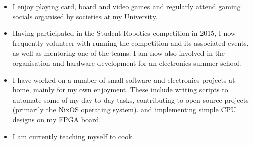 
\begin{itemize}
\item I enjoy playing card, board and video games and regularly attend gaming socials organised by societies at my University.
\item Having participated in the Student Robotics competition in 2015, I now frequently volunteer with running the competition and its associated events, as well as mentoring one of the teams. I am now also involved in the organisation and hardware development for an electronics summer school.
\item I have worked on a number of small software and electronics projects at home, mainly for my own enjoyment. These include writing scripts to automate some of my day-to-day tasks, contributing to open-source projects (primarily the NixOS operating system). and implementing simple CPU designs on my FPGA board.
\item I am currently teaching myself to cook.
\end{itemize}
